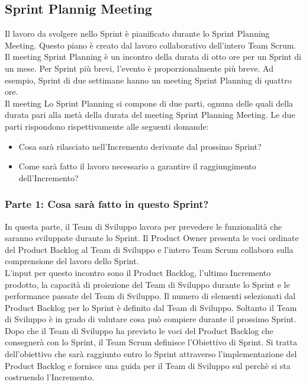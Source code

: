 \subsection*{Sprint Plannig Meeting} %
\label{sub:sprint_plannig_meeting}
Il lavoro da svolgere  nello Sprint \`e pianificato durante lo Sprint Planning Meeting. Questo piano \`e creato dal lavoro 
collaborativo dell'intero Team Scrum. \newline
\\Il meeting Sprint Planning \`e un incontro della durata di otto ore per un Sprint di un mese. Per Sprint pi\`u brevi, 
l'evento \`e proporzionalmente pi\`u breve. Ad esempio, Sprint di due settimane hanno un meeting Sprint Planning di quattro 
ore. \newline
\\Il meeting Lo Sprint Planning si compone di due parti, ognuna delle quali della durata pari alla met\`a della durata del meeting 
Sprint Planning Meeting. Le due parti rispondono rispettivamente alle seguenti domande:

\begin{itemize}
	\item Cosa sar\`a rilasciato nell'Incremento derivante dal prossimo Sprint?
	\item Come sar\`a fatto il lavoro necessario a garantire il raggiungimento dell'Incremento?
\end{itemize}

\subsubsection*{Parte 1: Cosa sar\`a fatto in questo Sprint?} %
\label{ssub:part_one}
In questa parte, il Team di Sviluppo lavora per prevedere le funzionalit\`a che saranno sviluppate durante lo Sprint. Il 
Product Owner presenta le voci ordinate del Product Backlog al Team di Sviluppo e l'intero Team Scrum collabora sulla 
comprensione del lavoro dello Sprint. \newline
\\L'input per questo incontro sono il Product Backlog, l'ultimo Incremento prodotto, la capacit\`a di proiezione del Team di 
Sviluppo durante lo Sprint e le performance passate del Team di Sviluppo. Il numero di elementi selezionati dal Product Backlog 
per lo Sprint \`e definito dal Team di Sviluppo. Soltanto il Team di Sviluppo \`e in grado di valutare cosa pu\`o compiere 
durante il prossimo Sprint. \newline
\\Dopo che il Team di Sviluppo ha previsto le voci del Product Backlog che consegner\`a con lo Sprint, il Team Scrum definisce 
l'Obiettivo di Sprint. Si tratta dell'obiettivo che sar\`a raggiunto entro lo Sprint attraverso l'implementazione del Product 
Backlog e fornisce una guida per il Team di Sviluppo sul perch\`e si sta costruendo l'Incremento.

